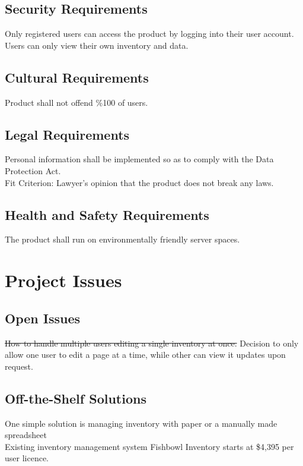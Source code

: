 \documentclass[12pt, titlepage]{article}
\begin{document}
\subsection{Security Requirements}
Only registered users can access the product by logging into their user account.\\
Users can only view their own inventory and data.\\

\subsection{Cultural Requirements}
Product shall not offend \%100 of users.

\subsection{Legal Requirements}
Personal information shall be implemented so as to comply with the Data Protection Act.\\
Fit Criterion: Lawyer's opinion that the product does not break any laws.\\

\subsection{Health and Safety Requirements}
The product shall run on environmentally friendly server spaces.\\
\section{Project Issues}
\subsection{Open Issues}
\sout{How to handle multiple users editing a single inventory at once.} Decision to only allow one user to edit a page at a time, while other can view it updates upon request. \\

\subsection{Off-the-Shelf Solutions}
One simple solution is managing inventory with paper or a manually made spreadsheet\\
Existing inventory management system Fishbowl Inventory starts at \$4,395 per user licence.\\
\end{document}
